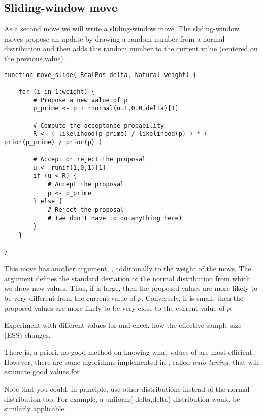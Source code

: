 \subsection{Sliding-window move}
As a second move we will write a sliding-window move.
The sliding-window moves propose an update by drawing a random number from a normal distribution and then adds this random number to the current value (\IE centered on the previous value).
{\tt \begin{snugshade*}
\begin{lstlisting}    
function move_slide( RealPos delta, Natural weight) {

    for (i in 1:weight) {
        # Propose a new value of p
        p_prime <- p + rnormal(n=1,0.0,delta)[1]

        # Compute the acceptance probability
        R <- ( likelihood(p_prime) / likelihood(p) ) * ( prior(p_prime) / prior(p) )
    
        # Accept or reject the proposal
        u <- runif(1,0,1)[1]
        if (u < R) {
            # Accept the proposal
            p <- p_prime
        } else {
            # Reject the proposal
            # (we don't have to do anything here)
        }
    }
    
}
\end{lstlisting}
\end{snugshade*}}
This move has another argument, , additionally to the weight of the move.
The argument  defines the standard deviation of the normal distribution from which we draw new values.
Thus, if  is large, then the proposed values are more likely to be very different from the current value of $p$.
Conversely, if  is small, then the proposed values are more likely to be very close to the current value of $p$.

\impmark Experiment with different values for  and check how the effective sample size (ESS) changes.

There is, a priori, no good method on knowing what values of  are most efficient.
However, there are some algorithms implemented in \RevBayes, called \emph{auto-tuning}, that will estimate good values for .


\begin{framed}
Note that you could, in principle, use other distributions instead of the normal distribution too. For example, a uniform(-delta,delta) distribution would be similarly applicable.
\end{framed}

